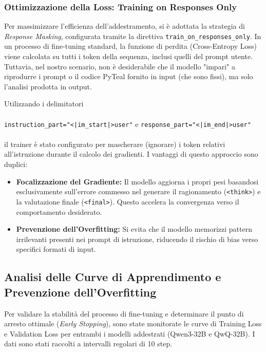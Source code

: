 \subsubsection{Ottimizzazione della Loss: Training on Responses Only}
Per massimizzare l'efficienza dell'addestramento, si è adottata la strategia di \textit{Response Masking}, configurata tramite la direttiva \texttt{train\_on\_responses\_only}.
In un processo di fine-tuning standard, la funzione di perdita (Cross-Entropy Loss) viene calcolata su tutti i token della sequenza, inclusi quelli del prompt utente. Tuttavia, nel nostro scenario, non è desiderabile che il modello "impari" a riprodurre i prompt o il codice PyTeal fornito in input (che sono fissi), ma solo l'analisi prodotta in output.

Utilizzando i delimitatori \\\\ \texttt{instruction\_part="<|im\_start|>user"} e \texttt{response\_part="<|im\_end|>user"} \\\\ il trainer è stato configurato per mascherare (ignorare) i token relativi all'istruzione durante il calcolo dei gradienti. I vantaggi di questo approccio sono duplici:
\begin{itemize}
    \item \textbf{Focalizzazione del Gradiente:} Il modello aggiorna i propri pesi basandosi esclusivamente sull'errore commesso nel generare il ragionamento (\texttt{<think>}) e la valutazione finale (\texttt{<final>}). Questo accelera la convergenza verso il comportamento desiderato.
    \item \textbf{Prevenzione dell'Overfitting:} Si evita che il modello memorizzi pattern irrilevanti presenti nei prompt di istruzione, riducendo il rischio di bias verso specifici formati di input.
\end{itemize}

\subsection{Analisi delle Curve di Apprendimento e Prevenzione dell'Overfitting}
\label{sec:loss_analysis}

Per validare la stabilità del processo di fine-tuning e determinare il punto di arresto ottimale (\textit{Early Stopping}), sono state monitorate le curve di Training Loss e Validation Loss per entrambi i modelli addestrati (Qwen3-32B e QwQ-32B). I dati sono stati raccolti a intervalli regolari di 10 step.

